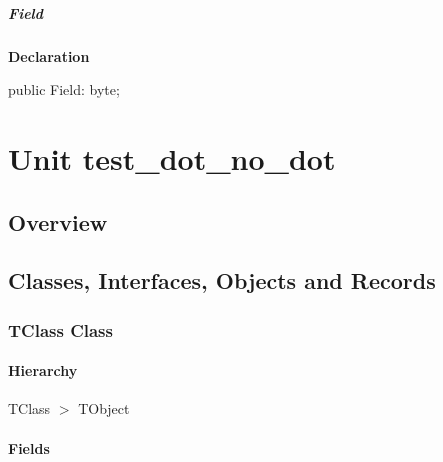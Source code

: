 \documentclass{report}
\begin{document}
\paragraph*{Field}\hspace*{\fill}

\begin{list}{}{
\setlength{\itemindent}{0cm}
\setlength{\listparindent}{0cm}
\setlength{\leftmargin}{\evensidemargin}
\addtolength{\leftmargin}{\tmplength}
\settowidth{\labelsep}{X}
\addtolength{\leftmargin}{\labelsep}
\setlength{\labelwidth}{\tmplength}
}
\begin{flushleft}
\item[\textbf{Declaration}\hfill]
\begin{ttfamily}
public Field: byte;\end{ttfamily}


\end{flushleft}
\end{list}
\chapter{Unit test{\_}dot{\_}no{\_}dot}
\section{Overview}
\begin{description}
\item[\texttt{\begin{ttfamily}TClass\end{ttfamily} Class}]
\end{description}
\section{Classes, Interfaces, Objects and Records}
\subsection*{TClass Class}
\subsubsection*{\large{\textbf{Hierarchy}}\normalsize\hspace{1ex}\hfill}
TClass {$>$} TObject
\subsubsection*{\large{\textbf{Fields}}\normalsize\hspace{1ex}\hfill}
\end{document}
